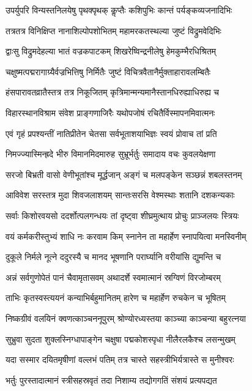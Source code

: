 \twolineshloka
{उपर्युपरि विन्यस्तनिलयेषु पृथक्पृथक्}
{कॢप्तैः कशिपुभिः कान्तं पर्यङ्कव्यजनादिभिः}%

\twolineshloka
{तत्रतत्र विनिक्षिप्त नानाशिल्पोपशोभितम्}
{महामरकतस्थल्या जुष्टं विद्रुमवेदिभिः}%

\twolineshloka
{द्वाःसु विद्रुमदेहल्या भातं वज्रकपाटकम्}
{शिखरेष्विन्द्रनीलेषु हेमकुम्भैरधिश्रितम्}%

\twolineshloka
{चक्षुष्मत्पद्मरागाग्र्यैर्वज्रभित्तिषु निर्मितैः}
{जुष्टं विचित्रवैतानैर्मुक्ताहारावलम्बितैः}%

\twolineshloka
{हंसपारावतव्रातैस्तत्र तत्र निकूजितम्}
{कृत्रिमान्मन्यमानैस्तानधिरुह्याधिरुह्य च}%

\twolineshloka
{विहारस्थानविश्राम संवेश प्राङ्गणाजिरैः}
{यथोपजोषं रचितैर्विस्मापनमिवात्मनः}%

\twolineshloka
{एवं गृहं प्रपश्यन्तीं नातिप्रीतेन चेतसा}
{सर्वभूताशयाभिज्ञः स्वयं प्रोवाच तां प्रति}%

\twolineshloka
{निमज्ज्यास्मिन्ह्रदे भीरु विमानमिदमारुह}
{सुभ्रूर्भर्तुः समादाय वचः कुवलयेक्षणा}%

\twolineshloka
{सरजो बिभ्रती वासो वेणीभूतांश्च मूर्द्धजान्}
{अङ्गं च मलपङ्केन सञ्छन्नं शबलस्तनम्}%

\twolineshloka
{आविवेश सरस्तत्र मुदा शिवजलाशयम्}
{सान्तःसरसि वेश्मस्थाः शतानि दशकन्यकाः}%

\twolineshloka
{सर्वाः किशोरवयसो ददर्शोत्पलगन्धयः}
{तां दृष्ट्वा शीघ्रमुत्थाय प्रोचुः प्राञ्जलयः स्त्रियः}%

\twolineshloka
{वयं कर्मकरीस्तुभ्यं शाधि नः करवाम किम्}
{स्नानेन ता महार्हेण स्नापयित्वा मनस्विनीम्}%

\twolineshloka
{दुकूले निर्मले नूत्ने ददुरस्यै च मानद}
{भूषणानि परार्घ्यानि वरीयांसि द्युमन्ति च}%

\twolineshloka
{अन्नं सर्वगुणोपेतं पानं चैवामृतासवम्}
{अथादर्शे स्वमात्मानं स्रग्विणं विरजोम्बरम्}%

\twolineshloka
{ताभिः कृतस्वस्त्ययनं कन्याभिर्बहुमानितम्}
{हारेण च महार्हेण रुचकेन च भूषितम्}%

\twolineshloka
{निष्कग्रीवं वलयिनं क्वणत्काञ्चननूपुरम्}
{श्रोण्योरध्यस्तया काञ्च्या काञ्चन्या बहुरत्नया}%

\twolineshloka
{सुभ्रुवा सुदता शुक्लस्निग्धापाङ्गेन चक्षुषा}
{पद्मकोशस्पृधा नीलैरलकैश्च लसन्मुखम्}%

\twolineshloka
{यदा सस्मार दयितमृषीणां वल्लभं पतिम्}
{तत्र चास्ते सहस्त्रीभिर्यत्रास्ते स मुनीश्वरः}%

\twolineshloka
{भर्तुः पुरस्तादात्मानं स्त्रीसहस्रवृतं तदा}
{निशाम्य तद्योगगतिं संशयं प्रत्यपद्यत}%

